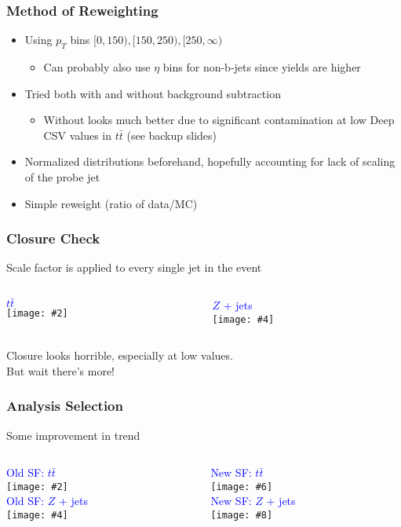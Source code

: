 \documentclass{beamer}
\newcommand{\twofigs}[4]{
  \begin{columns}
    \begin{column}{0.5\linewidth}
      \centering
      \textcolor{blue}{#1} \\
      \texttt{[image: \#2]}
    \end{column}
    \begin{column}{0.5\linewidth}
      \centering
      \textcolor{blue}{#3} \\
      \texttt{[image: \#4]}
    \end{column}
  \end{columns}
}
\newcommand{\fourfigs}[8]{
  \begin{columns}
    \begin{column}{0.3\linewidth}
      \centering
      \textcolor{blue}{#1} \\
      \texttt{[image: \#2]} \\
      \textcolor{blue}{#3} \\
      \texttt{[image: \#4]}
    \end{column}
    \begin{column}{0.3\linewidth}
      \centering
      \textcolor{blue}{#5} \\
      \texttt{[image: \#6]} \\
      \textcolor{blue}{#7} \\
      \texttt{[image: \#8]}
    \end{column}
  \end{columns}
}
\newcommand{\ttbar}{\ensuremath{t\bar{t}}}
\begin{document}
\begin{frame}
  \frametitle{Method of Reweighting}

  \begin{itemize}
  \item Using $p_T$ bins $[0, 150), [150, 250), [250, \infty)$
    \begin{itemize}
    \item Can probably also use $\eta$ bins for non-b-jets since yields are higher
    \end{itemize}
  \item Tried both with and without background subtraction
    \begin{itemize}
    \item Without looks much better due to significant contamination
      at low Deep CSV values in $\ttbar$ (see backup slides)
    \end{itemize}
  \item Normalized distributions beforehand,
    hopefully accounting for lack of scaling of the probe jet
  \item Simple reweight (ratio of data/MC)
  \end{itemize}

\end{frame}

\begin{frame}
  \frametitle{Closure Check}

  Scale factor is applied to every single jet in the event

  \twofigs{\ttbar}
          {190215_closure/tt_jet2_deepCSVb.pdf}
          {$Z$ + jets}
          {190215_closure/z_jet2_deepCSVb.pdf}

  Closure looks horrible, especially at low values. \\ But wait there's more!

\end{frame}

\begin{frame}
  \frametitle{Analysis Selection}

  Some improvement in trend

  \fourfigs{Old SF: \ttbar}
           {190219_olddeep/tt_jet2_deepCSVb.pdf}
           {Old SF: $Z$ + jets}
           {190219_olddeep/heavyz_jet2_deepCSVb.pdf}
           {New SF: \ttbar}
           {190219_newdeep/tt_jet2_deepCSVb.pdf}
           {New SF: $Z$ + jets}
           {190219_newdeep/heavyz_jet2_deepCSVb.pdf}

\end{frame}
\end{document}
